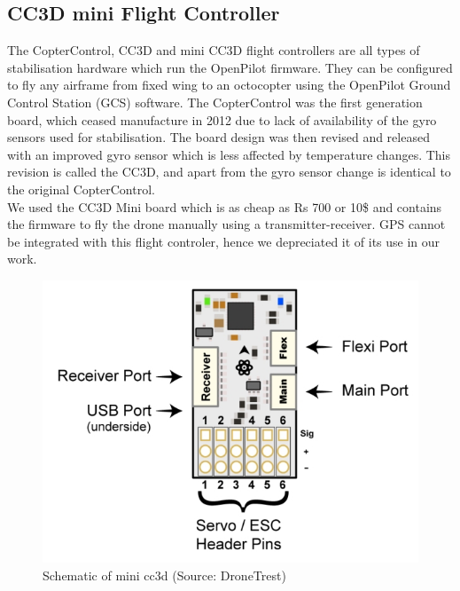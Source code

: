 \subsection{CC3D mini Flight Controller}
The CopterControl, CC3D and mini CC3D flight controllers are all types of stabilisation hardware which run the OpenPilot firmware. They can be configured to fly any airframe from fixed wing to an octocopter using the OpenPilot Ground Control Station (GCS) software. The CopterControl was the first generation board, which ceased manufacture in 2012 due to lack of availability of the gyro sensors used for stabilisation. The board design was then revised and released with an improved gyro sensor which is less affected by temperature changes. This revision is called the CC3D, and apart from the gyro sensor change is identical to the original CopterControl.
\\
We used the CC3D Mini board which is as cheap as Rs 700 or 10\$ and contains the firmware to fly the drone manually using a transmitter-receiver. GPS cannot be integrated with this flight controler, hence we depreciated it of its use in our work. 

\begin{figure}[H]
    \centering
    \includegraphics[scale=0.35]{SummerInterReport/project/Images-Major/cc3d.png}
    \caption{Schematic of mini cc3d (Source: DroneTrest)}
    \label{fig:compEy}
\end{figure}
